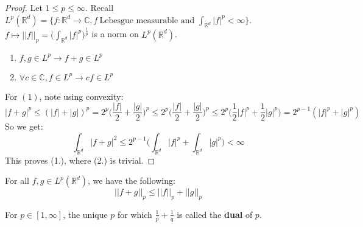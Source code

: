 \documentclass[12pt]{article}
\newcommand{\R}{\mathbb{R}}
\newenvironment{theorem}[2][Theorem]{\begin{trivlist}
\item[\hskip \labelsep {\bfseries #1}\hskip \labelsep {\bfseries #2.}]}{\end{trivlist}}
\newenvironment{definition}[2][Definition]{\begin{trivlist}
\item[\hskip \labelsep {\bfseries #1}\hskip \labelsep {\bfseries #2.}]}{\end{trivlist}}
\begin{document}
\begin{theorem}{(Lp Spaces are Normed Spaces)}
    \begin{proof}
        Let $1 \leq p \leq \infty$. Recall $L^p(\R^d) = \{f : \R^d \rightarrow \mathbb{C}, f \: \text{Lebesgue measurable and } \int_{\R^d}|f|^p < \infty\}$. \\
        $f \mapsto ||f||_p = \Big (\int_{\R^d} |f|^p \Big)^{\frac{1}{p}}$ is a norm on $L^p(\R^d)$. 
        \begin{enumerate}
            \item $f, g \in L^p \rightarrow f + g \in L^p$
            \item $\forall c \in \mathbb{C}, f \in L^p \rightarrow cf \in L^p$
        \end{enumerate}
        For $(1)$, note using convexity:
        $$|f + g|^p \leq (|f| + |g|)^p = 2^p \Big(\frac{|f|}{2} + \frac{|g|}{2} \Big)^p \leq 2^p \Big (\frac{|f|}{2} + \frac{|g|}{2} \Big)^p \leq 2^p \Big ( \frac{1}{2} |f|^p + \frac{1}{2}|g|^p \Big ) = 2^{p - 1}(|f|^p + |g|^p)$$
        So we get:
        $$\int_{\R^d} |f + g|^2 \leq 2^{p - 1}\Big (\int_{\R^d} |f|^p + \int_{\R^d} |g|^p \Big) < \infty$$
        This proves (1.), where (2.) is trivial.
    \end{proof}
\end{theorem}

\begin{theorem}{(Minkowski's Inequality)}
    For all $f, g \in L^p(\R^d)$, we have the following:
    $$||f + g||_p \leq ||f||_p + ||g||_p$$
\end{theorem}

\begin{definition}{(Dual)}
    For $p \in [1, \infty]$, the unique $p$ for which $\frac{1}{p} + \frac{1}{q}$ is called the \textbf{dual} of $p$.
\end{definition}
\end{document}
